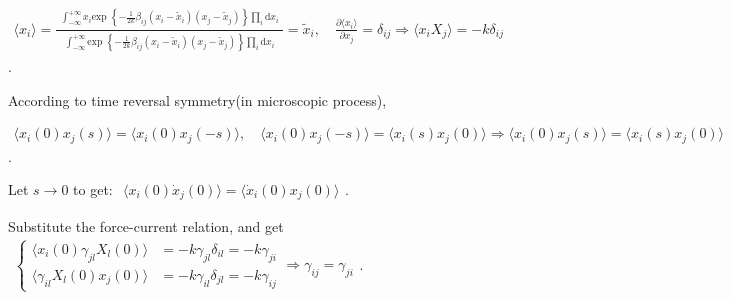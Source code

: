 \documentclass[../../main.tex]{subfiles}
\begin{document}
  $\begin{aligned}
    \langle x_{i}\rangle = \frac{\begin{aligned}
      \int_{-\infty}^{+\infty}x_{i}\text{exp }\left\{-\frac{1}{2k}\beta_{ij}\left(x_{i}-\widetilde{x}_{i}\right)\left(x_{j}-\widetilde{x}_{j}\right)\right\}\prod_{i}\mathrm{d}x_{i}
    \end{aligned}}{\begin{aligned}
      \int_{-\infty}^{+\infty}\text{exp }\left\{-\frac{1}{2k}\beta_{ij}\left(x_{i}-\widetilde{x}_{i}\right)\left(x_{j}-\widetilde{x}_{j}\right)\right\}\prod_{i}\mathrm{d}x_{i}
    \end{aligned}} = \widetilde{x}_{i},\quad \frac{\partial\langle x_{i}\rangle}{\partial x_{j}} = \delta_{ij}\Rightarrow \langle x_{i}X_{j}\rangle = -k\delta_{ij}
  \end{aligned}$. 

  According to time reversal symmetry(in microscopic process), 
  
  $\begin{aligned}
    \langle x_{i}(0)x_{j}(s)\rangle = \langle x_{i}(0)x_{j}(-s)\rangle,\quad \langle x_{i}(0)x_{j}(-s)\rangle = \langle x_{i}(s)x_{j}(0)\rangle\Rightarrow \langle x_{i}(0)x_{j}(s)\rangle = \langle x_{i}(s)x_{j}(0)\rangle
  \end{aligned}$. 
  
  Let $s\rightarrow 0$ to get: $\begin{aligned}
    \langle x_{i}(0)\dot{x}_{j}(0)\rangle = \langle \dot{x}_{i}(0)x_{j}(0)\rangle
  \end{aligned}$. 
  
  Substitute the force-current relation, and get $\begin{aligned}\left\{\begin{aligned}
     \langle x_{i}(0)\gamma_{jl}X_{l}(0)\rangle &= -k\gamma_{jl}\delta_{il} = -k\gamma_{ji}\\
    \langle \gamma_{il}X_{l}(0)x_{j}(0)\rangle &= -k\gamma_{il}\delta_{jl} = -k\gamma_{ij}
  \end{aligned}\right.\Rightarrow \boxed{\gamma_{ij} = \gamma_{ji}}
  \end{aligned}$.
\end{document}
